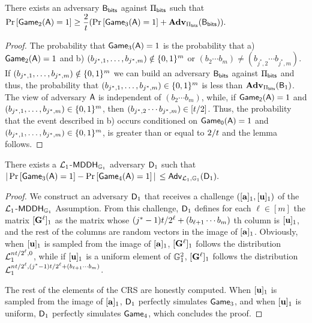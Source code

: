 \begin{lemma} There exists an adversary \(\mathsf{B}_{\mathsf{bits}}\) against \(\Pi_{\mathsf{bits}}\) such that
\(\Pr\left[ \mathsf{Game}_2(\mathsf{A})=1\right]\geq\dfrac{2}{t }(\Pr\left[\mathsf{Game}_3(\mathsf{A})=1\right]+\mathbf{Adv}_{\Pi_{\mathsf{bits}}}(\mathsf{B}_{\mathsf{bits}})).\)
\end{lemma}

\begin{proof}  The probability that
 \(\mathsf{Game}_3(\mathsf{A})=1\) is the probability that  a) \(\mathsf{Game}_2(\mathsf{A})=1\) and
b) \((b_{j^*,1},\ldots,b_{j^*,m})\notin\{0,1\}^m\) or \((b_2\cdots b_m) \neq (b_{j^*,2}\cdots b_{j^*,m})\). If \((b_{j^*,1},\ldots,\allowbreak b_{j^*,m})\notin\{0,1\}^m\) we can build an adversary \(\mathsf{B}_{\mathsf{bits}}\) against \(\Pi_{\mathsf{bits}}\) and thus, the probability that \((b_{j^*,1},\ldots,b_{j^*,m})\in\{0,1\}^m\) is less than \(\mathbf{Adv}_{\Pi_{\mathsf{bits}}}(\mathsf{B}_1)\). The view of adversary \(\mathsf{A}\) is independent of \((b_{2}\cdots b_{m})\), while, if \(\mathsf{Game_2}(\mathsf{A})=1\) and \((b_{j^*,1},\ldots,b_{j^*,m})\in\{0,1\}^{m}\), then \((b_{j^*,2}\cdots b_{j^*,m})\in[t /2]\). Thus, 
the probability that the event described in b) occurs conditioned on \(\mathsf{Game_0}(\mathsf{A})=1\) and \((b_{j^*,1},\ldots,b_{j^*,m})\in\{0,1\}^{m}\), is greater than or equal to \(2/t \) and the lemma follows.
\end{proof}

\begin{lemma} There exists a \(\mathcal{L}_1\)-\(\mathsf{MDDH}_{\mathbb{G}_1}\) adversary \(\mathsf{D}_1\) such that
\(|\Pr\left[\mathsf{Game}_{3}(\mathsf{A})=1\right]\allowbreak-\Pr\left[\mathsf{Game}_{4}(\mathsf{A})=1\right]|\) $\leq
    \mathsf{Adv}_{\mathcal{L}_1,\mathbb{G}_1}(\mathsf{D}_1).$
\label{lemma:bits2}
\end{lemma}

\begin{proof}
We construct an adversary \(\mathsf{D}_1\) that receives 
a challenge \(([\mathbf{a}]_1,[\mathbf{u}]_1)\) of the 
\(\mathcal{L}_1\)-\(\mathsf{MDDH}_{\mathbb{G}_1}\) Assumption. From this challenge, \(\mathsf{D}_1\) defines for each \(\ell\in [m]\) the matrix  \([\mathbf{{G}}^\ell]_1\) as the matrix whose  \((j^*-1)t /2^\ell+(b_{\ell+1}\cdots b_m)\) th column is \([\mathbf{u}]_1\), and the rest of the columns are random vectors in the image of \([\mathbf{a}]_1\). 
Obviously, when \([\mathbf{u}]_1\) is sampled from 
the image of \([\mathbf{a}]_1\), \([\mathbf{{G}}^\ell]_1\) follows the distribution \(\mathcal{L}_1^{nt /2^\ell,0}\), while if \([\mathbf{u}]_1\) is a uniform element of \(\mathbb{G}^2_1\), \([\mathbf{{G}}^\ell]_1\) follows the distribution \(\mathcal{L}_1^{nt /2^\ell,(j^*-1)t /2^\ell+(b_{\ell+1}\cdots b_m)}\). 
 
The rest of the elements of the CRS are honestly computed. When \([\mathbf{u}]_1\) is sampled from the image of \([\mathbf{{a}}]_1\), \(\mathsf{D}_1\) perfectly simulates \(\mathsf{Game}_3\), and when \([\mathbf{u}]_1\) is uniform, \(\mathsf{D}_1\) perfectly simulates \(\mathsf{Game}_4\), which concludes the proof. 
\end{proof}


